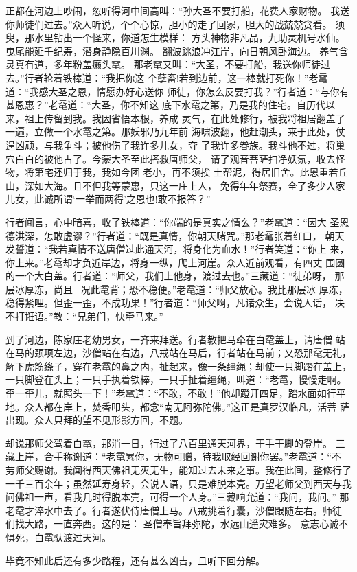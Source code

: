正都在河边上吵闹，忽听得河中间高叫：“孙大圣不要打船，花费人家财物。
我送你师徒们过去。”众人听说，个个心惊，胆小的走了回家，胆大的战兢兢贪看。
须臾，那水里钻出一个怪来，你道怎生模样：
方头神物非凡品，九助灵机号水仙。
曳尾能延千纪寿，潜身静隐百川渊。
翻波跳浪冲江岸，向日朝风卧海边。
养气含灵真有道，多年粉盖癞头鼋。
那老鼋又叫：“大圣，不要打船，我送你师徒过去。”行者轮着铁棒道：“我把你这
个孽畜!若到边前，这一棒就打死你！”老鼋道：“我感大圣之恩，情愿办好心送你
师徒，你怎么反要打我？”行者道：“与你有甚恩惠？”老鼋道：“大圣，你不知这
底下水鼋之第，乃是我的住宅。自历代以来，祖上传留到我。我因省悟本根，养成
灵气，在此处修行，被我将祖居翻盖了一遍，立做一个水鼋之第。那妖邪乃九年前
海啸波翻，他赶潮头，来于此处，仗逞凶顽，与我争斗；被他伤了我许多儿女，夺
了我许多眷族。我斗他不过，将巢穴白白的被他占了。今蒙大圣至此搭救唐师父，
请了观音菩萨扫净妖氛，收去怪物，将第宅还归于我，我如今团老小，再不须挨
土帮泥，得居旧舍。此恩重若丘山，深如大海。且不但我等蒙惠，只这一庄上人，
免得年年祭赛，全了多少人家儿女，此诚所谓‘一举而两得’之恩也!敢不报答？”

行者闻言，心中暗喜，收了铁棒道：“你端的是真实之情么？”老鼋道：“因大
圣恩德洪深，怎敢虚谬？”行者道：“既是真情，你朝天赌咒。”那老鼋张着红口，
朝天发誓道：“我若真情不送唐僧过此通天河，将身化为血水！”行者笑道：“你上
来，你上来。”老鼋却才负近岸边，将身一纵，爬上河崖。众人近前观看，有四丈
围圆的一个大白盖。行者道：“师父，我们上他身，渡过去也。”三藏道：“徒弟呀，
那层冰厚冻，尚且，况此鼋背；恐不稳便。”老鼋道：“师父放心。我比那层冰
厚冻，稳得紧哩。但歪一歪，不成功果！”行者道：“师父啊，凡诸众生，会说人话，
决不打诳语。”教：“兄弟们，快牵马来。”

到了河边，陈家庄老幼男女，一齐来拜送。行者教把马牵在白鼋盖上，请唐僧
站在马的颈项左边，沙僧站在右边，八戒站在马后，行者站在马前；又恐那鼋无礼，
解下虎筋绦子，穿在老鼋的鼻之内，扯起来，像一条缰绳；却使一只脚踏在盖上，
一只脚登在头上；一只手执着铁棒，一只手扯着缰绳，叫道：“老鼋，慢慢走啊。
歪一歪儿，就照头一下！”老鼋道：“不敢，不敢！”他却蹬开四足，踏水面如行平
地。众人都在岸上，焚香叩头，都念“南无阿弥陀佛。”这正是真罗汉临凡，活菩
萨出现。众人只拜的望不见形影方回，不题。

却说那师父驾着白鼋，那消一日，行过了八百里通天河界，干手干脚的登岸。
三藏上崖，合手称谢道：“老鼋累你，无物可赠，待我取经回谢你罢。”老鼋道：“不
劳师父赐谢。我闻得西天佛祖无灭无生，能知过去未来之事。我在此间，整修行了
一千三百余年；虽然延寿身轻，会说人语，只是难脱本壳。万望老师父到西天与我
问佛祖一声，看我几时得脱本壳，可得一个人身。”三藏响允道：“我问，我问。”
那老鼋才淬水中去了。行者遂伏侍唐僧上马。八戒挑着行囊，沙僧跟随左右。师徒
们找大路，一直奔西。这的是：
圣僧奉旨拜弥陀，水远山遥灾难多。
意志心诚不惧死，白鼋驮渡过天河。

毕竟不知此后还有多少路程，还有甚么凶吉，且听下回分解。